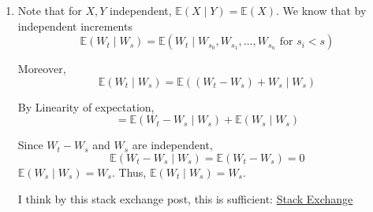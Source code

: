 \documentclass[12pt]{article}
\begin{document}
\begin{enumerate}[start=1,label={\bfseries Problem \arabic*:},leftmargin=1in]
    \item Note that for $X, Y$ independent, $\mathbb{E}(X \mid Y) = \mathbb{E}(X)$.
    We know that by independent increments 
    \[
        \mathbb{E}(W_t \mid W_s) = \mathbb{E}(W_t \mid W_{s_0}, W_{s_1}, \ldots, W_{s_n} \text{ for } s_i < s)
    \]

    Moreover, \[ \mathbb{E}(W_t \mid W_s) = \mathbb{E}((W_t - W_s) +  W_s \mid W_s) \]

    By Linearity of expectation, 
    \[
        = \mathbb{E}(W_t - W_s \mid W_s) + \mathbb{E}(W_s \mid W_s)
    \]

    Since $W_t - W_s$ and $W_s$ are independent, \[\mathbb{E}(W_t - W_s \mid W_s) = \mathbb{E}(W_t - W_s) = 0\]
    $\mathbb{E}(W_s \mid W_s) = W_s$. Thus, $\mathbb{E}(W_t \mid W_s) = W_s$. 

    I think by this stack exchange post, this is sufficient: \href{https://math.stackexchange.com/questions/1348253/elementary-markov-property-of-the-brownian-motion}{Stack Exchange}
\end{enumerate}
\end{document}
